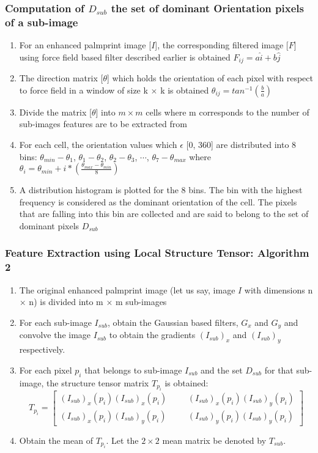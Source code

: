 \documentclass{beamer}
\begin{document}
\begin{frame}
\frametitle{Computation of $D_{sub}$ the set of dominant Orientation pixels of a sub-image}
 	\begin{enumerate}
		\item For an enhanced palmprint image [$I$], the corresponding filtered image [$F$] using force field based filter described earlier is obtained
$F_{ij} = a \hat{i} + b \hat{j}$  
  \item The direction matrix [$\theta$] which holds the orientation of each pixel with respect to force field in a window of size k $\times$ k is obtained 
$\theta_{ij} = tan^{-1} (\frac{b}{a})$ 
  \item Divide the matrix [$\theta$]  into  $m \times m$ cells where m corresponds to the number of sub-images features are to be extracted from 
  \item For each cell, the orientation values which $\epsilon$ [0, 360] are distributed into 8 bins: $\theta_{min} - \theta_1$, $\theta_1 - \theta_2$, $\theta_2 - \theta_3$, $\cdots$, $\theta_7 - \theta_{max}$
where $\theta_i = \theta_{min} + i * (\frac{\theta_{max} - \theta_{min}}{8})$    
  \item A distribution histogram is plotted for the 8 bins. The bin with the highest frequency is considered as the dominant orientation of the cell. The pixels that are falling into this bin are collected and are said to belong to the set of dominant pixels $D_{sub}$
	\end{enumerate}
\end{frame}

\begin{frame}
\frametitle{Feature Extraction using Local Structure Tensor: Algorithm 2}
\begin{enumerate}
 \item The original enhanced palmprint image (let us say, image $I$ with dimensions n $\times$ n) is divided into m $\times$ m sub-images
  \item For each sub-image $I_{sub}$, obtain the Gaussian based filters,
$G_x$ and $G_y$ and convolve the image $I_{sub}$ to obtain the gradients $(I_{sub})_{x}$ and $(I_{sub})_{y}$ respectively. 
  \item For each pixel $p_i$ that belongs to sub-image $I_{sub}$ and the set $D_{sub}$ for that sub-image, the structure tensor matrix $T_{p_{i}}$ is obtained:
\begin{equation}
 T_{p_{i}} = \begin{bmatrix} (I_{sub})_x(p_i) (I_{sub})_x(p_i) & & & (I_{sub})_x(p_i) (I_{sub})_y(p_i) \\ (I_{sub})_x(p_i) (I_{sub})_y(p_i) & & & (I_{sub})_y(p_i) (I_{sub})_y(p_i) \end{bmatrix}
\end{equation}
  \item Obtain the mean of $T_{p_{i}}$. Let the $2 \times 2$ mean matrix be denoted by $T_{sub}$.
\end{enumerate}
\end{frame}
\end{document}
